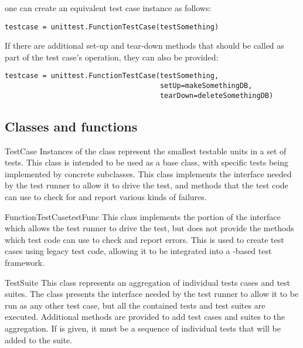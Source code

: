 one can create an equivalent test case instance as follows:

\begin{verbatim}
testcase = unittest.FunctionTestCase(testSomething)
\end{verbatim}

If there are additional set-up and tear-down methods that should be
called as part of the test case's operation, they can also be provided:

\begin{verbatim}
testcase = unittest.FunctionTestCase(testSomething,
                                     setUp=makeSomethingDB,
                                     tearDown=deleteSomethingDB)
\end{verbatim}



\subsection{Classes and functions
            \label{unittest-contents}}

\begin{classdesc}{TestCase}{}
  Instances of the  class represent the smallest
  testable units in a set of tests.  This class is intended to be used
  as a base class, with specific tests being implemented by concrete
  subclasses.  This class implements the interface needed by the test
  runner to allow it to drive the test, and methods that the test code
  can use to check for and report various kinds of failures.
\end{classdesc}

\begin{classdesc}{FunctionTestCase}{testFunc}
  This class implements the portion of the  interface
  which allows the test runner to drive the test, but does not provide
  the methods which test code can use to check and report errors.
  This is used to create test cases using legacy test code, allowing
  it to be integrated into a -based test
  framework.
\end{classdesc}

\begin{classdesc}{TestSuite}{}
  This class represents an aggregation of individual tests cases and
  test suites.  The class presents the interface needed by the test
  runner to allow it to be run as any other test case, but all the
  contained tests and test suites are executed.  Additional methods
  are provided to add test cases and suites to the aggregation.  If
   is given, it must be a sequence of individual tests that
  will be added to the suite.
\end{classdesc}

